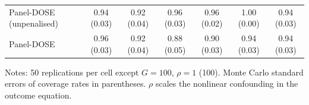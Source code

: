 \documentclass[preprint,12pt,authoryear]{elsarticle}
\begin{document}
\begin{table}[!ht]
\begin{threeparttable}
\begin{tabular}{lcccccc}
\quad Panel-DOSE (unpenalised) & 0.94 (0.03) & 0.92 (0.04) & 0.96 (0.03) & 0.96 (0.02) & 1.00 (0.00) & 0.94 (0.03)\\
\quad Panel-DOSE & 0.96 (0.03) & 0.92 (0.04) & 0.88 (0.05) & 0.90 (0.03) & 0.94 (0.03) & 0.94 (0.03)\\
\bottomrule
\end{tabular}
\begin{tablenotes}\scriptsize
\item Notes: 50 replications per cell except $G=100$, $\rho=1$ (100). Monte Carlo standard errors of coverage rates in parentheses. $\rho$ scales the nonlinear confounding in the outcome equation.
\end{tablenotes}
\end{threeparttable}
\end{table}
\end{document}
